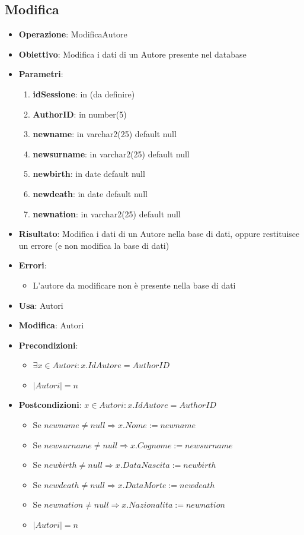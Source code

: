 \documentclass[a4paper,11pt]{article}
\begin{document}
\subsection{Modifica}
\begin{itemize}
	\item \textbf{Operazione}: ModificaAutore
	\item \textbf{Obiettivo}: Modifica i dati di un Autore presente nel database
	\item \textbf{Parametri}:
	\begin{enumerate}
		\item \textbf{idSessione}: in (da definire)
		\item \textbf{AuthorID}: in number(5)
		\item \textbf{newname}: in varchar2(25) default null
		\item \textbf{newsurname}: in varchar2(25) default null
		\item \textbf{newbirth}: in date default null
		\item \textbf{newdeath}: in date default null
		\item \textbf{newnation}: in varchar2(25) default null
	\end{enumerate}
	\item \textbf{Risultato}: Modifica i dati di un Autore nella base di dati, oppure restituisce un errore (e non modifica la base di dati)
	\item \textbf{Errori}: 
	\begin{itemize}
		\item L'autore da modificare non è presente nella base di dati
	\end{itemize}
	\item \textbf{Usa}: Autori
	\item \textbf{Modifica}: Autori
	\item \textbf{Precondizioni}:
	\begin{itemize}
		\item $\exists x \in Autori : x.IdAutore = AuthorID$
		\item $|Autori| = n$
	\end{itemize}
	\item \textbf{Postcondizioni}: $x \in Autori : x.IdAutore = AuthorID$
	\begin{itemize}
		\item Se $newname \ne null \Rightarrow x.Nome := newname$
		\item Se $newsurname \ne null \Rightarrow x.Cognome := newsurname$
		\item Se $newbirth \ne null \Rightarrow x.DataNascita := newbirth$
		\item Se $newdeath \ne null \Rightarrow x.DataMorte := newdeath$
		\item Se $newnation \ne null \Rightarrow x.Nazionalita := newnation$
		\item $|Autori| = n$
	\end{itemize}
\end{itemize}
\end{document}
